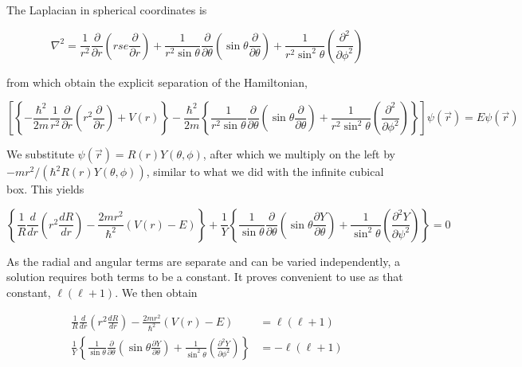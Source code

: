 The Laplacian in spherical coordinates is 

\[
\nabla^2 = \frac{1}{r^2} \frac{\partial }{\partial r}  \left( rse
\frac{\partial }{\partial r}  \right) + \frac{1}{r^2\sin\theta} \frac{\partial
}{\partial \theta} \left( \sin\theta \frac{\partial }{\partial \theta}  \right)
+ \frac{1}{r^2\sin^2\theta} \left( \frac{\partial^2 }{\partial \phi^2}  \right)  
\] \vspace{3px}

from which obtain the explicit separation of the Hamiltonian, 

\[
\left[ \left\{ -\frac{\hbar^2}{2m} \frac{1}{r^2} \frac{\partial }{\partial r}
  \left( r^2 \frac{\partial }{\partial r}  \right) + V(r) \right\}
  - \frac{\hbar^2}{2m} \left\{ \frac{1}{r^2\sin\theta} \frac{\partial }{\partial
    \theta}  \left( \sin\theta \frac{\partial }{\partial \theta}  \right)
    + \frac{1}{r^2\sin^2 \theta} \left( \frac{\partial^2 }{\partial \phi^2}
\right) \right\} \right] \psi(\vec{r}) = E\psi(\vec{r})   
\] \vspace{3px}

We substitute $\psi(\vec{r}) = R(r)Y(\theta, \phi)$, after which we multiply on
the left by $-mr^2 / (\hbar^2R(r) Y(\theta, \phi))$, similar to what we did
with the infinite cubical box. This yields 

\[
\left\{ \frac{1}{R} \frac{d }{d r} \left( r^2 \frac{d R}{d r}  \right)
- \frac{2mr^2}{\hbar^2} (V(r) - E) \right\} + \frac{1}{Y} \left\{
\frac{1}{\sin\theta} \frac{\partial }{\partial \theta} \left( \sin\theta
\frac{\partial Y}{\partial \theta}  \right) + \frac{1}{\sin^2\theta}\left(
\frac{\partial^2 Y}{\partial \psi^2}  \right) \right\} = 0   
\] \vspace{3px}


As the radial and angular terms are separate and can be varied independently,
a solution requires both terms to be a constant. It proves convenient to use as
that constant, $\ell ( \ell + 1)$. We then obtain 

\begin{align} \label{}
  \frac{1}{R} \frac{d }{d r} \left( r^2 \frac{d R}{d r}  \right)
  - \frac{2mr^2}{\hbar^2} (V(r) - E ) &= \ell(\ell + 1) \\  
  \frac{1}{Y} \left\{ \frac{1}{\sin\theta} \frac{\partial }{\partial \theta}
    \left( \sin\theta \frac{\partial Y}{\partial \theta}  \right)
    + \frac{1}{\sin^2\theta} \left( \frac{\partial^2 Y}{\partial \phi^2}
\right) \right\} &= -\ell(\ell +1)  
\end{align}\vspace{3px}



